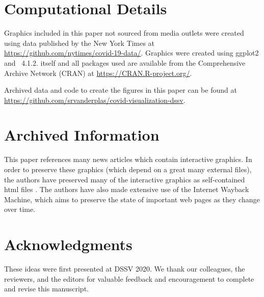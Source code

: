 \documentclass[article]{jdssv}\usepackage[]{graphicx}\usepackage[]{color}
\begin{document}

\newpage
\section*{Computational Details}
Graphics included in this paper not sourced from media outlets were created using data published by the New York Times at \url{https://github.com/nytimes/covid-19-data/}. Graphics were created using ggplot2 \citep{ggplot2} and ~4.1.2.  itself and all packages used are available from the Comprehensive  Archive Network (CRAN) at \url{https://CRAN.R-project.org/}.

Archived data and code to create the figures in this paper can be found at \url{https://github.com/srvanderplas/covid-visualization-dssv}.

\section*{Archived Information}
This paper references many news articles which contain interactive graphics. In order to preserve these graphics (which depend on a great many external files), the authors have preserved many of the interactive graphics as self-contained html files \citep{news-file-archive}. 
The authors have also made extensive use of the Internet Wayback Machine, which aims to preserve the state of important web pages as they change over time.

\section*{Acknowledgments}

These ideas were first presented at DSSV 2020. We thank our colleagues, the reviewers, and the editors for valuable feedback and encouragement to complete and revise this manuscript.

\end{document}
